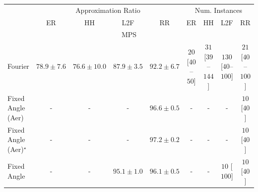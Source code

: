 \begin{tabular}{l|cccc|cccc|}
\toprule
& \multicolumn{4}{c|}{Approximation Ratio} & \multicolumn{4}{c|}{Num. Instances} \\
            & ER & HH & L2F & RR & ER & HH & L2F & RR \\
\midrule
\multicolumn{9}{c}{\rule{0pt}{8pt}MPS} \\
\midrule
Fourier & {\cellcolor[HTML]{FEB340}} \color[HTML]{000000} $78.9\pm 7.6$ & {\cellcolor[HTML]{FEC95B}} \color[HTML]{000000} $76.6\pm 10.0$ & {\cellcolor[HTML]{D65808}} \color[HTML]{F1F1F1} $87.9\pm 3.5$ & {\cellcolor[HTML]{A63A03}} \color[HTML]{F1F1F1} $92.2\pm 6.7$ & {\cellcolor[HTML]{FFF5F1}} \color[HTML]{000000} $20$ [$40$--$50$] & {\cellcolor[HTML]{FFF2EE}} \color[HTML]{000000} $31$ [$39$--$144$] & {\cellcolor[HTML]{FDD6D2}} \color[HTML]{000000} $130$ [$40$--$100$] & {\cellcolor[HTML]{FFF4F0}} \color[HTML]{000000} $21$ [$40$--$100$] \\
Fixed Angle (Aer) & {\cellcolor[HTML]{000000}} \color[HTML]{F1F1F1} {\cellcolor{white}} \color{black} - & {\cellcolor[HTML]{000000}} \color[HTML]{F1F1F1} {\cellcolor{white}} \color{black} - & {\cellcolor[HTML]{000000}} \color[HTML]{F1F1F1} {\cellcolor{white}} \color{black} - & {\cellcolor[HTML]{6C2706}} \color[HTML]{F1F1F1} $96.6\pm 0.5$ & {\cellcolor[HTML]{000000}} \color[HTML]{F1F1F1} {\cellcolor{white}} \color{black} - & {\cellcolor[HTML]{000000}} \color[HTML]{F1F1F1} {\cellcolor{white}} \color{black} - & {\cellcolor[HTML]{000000}} \color[HTML]{F1F1F1} {\cellcolor{white}} \color{black} - & {\cellcolor[HTML]{FFF7F3}} \color[HTML]{000000} $10$ [$40$] \\
Fixed Angle (Aer)$^\star$ & {\cellcolor[HTML]{000000}} \color[HTML]{F1F1F1} {\cellcolor{white}} \color{black} - & {\cellcolor[HTML]{000000}} \color[HTML]{F1F1F1} {\cellcolor{white}} \color{black} - & {\cellcolor[HTML]{000000}} \color[HTML]{F1F1F1} {\cellcolor{white}} \color{black} - & {\cellcolor[HTML]{662506}} \color[HTML]{F1F1F1} $97.2\pm 0.2$ & {\cellcolor[HTML]{000000}} \color[HTML]{F1F1F1} {\cellcolor{white}} \color{black} - & {\cellcolor[HTML]{000000}} \color[HTML]{F1F1F1} {\cellcolor{white}} \color{black} - & {\cellcolor[HTML]{000000}} \color[HTML]{F1F1F1} {\cellcolor{white}} \color{black} - & {\cellcolor[HTML]{FFF7F3}} \color[HTML]{000000} $10$ [$40$] \\
Fixed Angle & {\cellcolor[HTML]{000000}} \color[HTML]{F1F1F1} {\cellcolor{white}} \color{black} - & {\cellcolor[HTML]{000000}} \color[HTML]{F1F1F1} {\cellcolor{white}} \color{black} - & {\cellcolor[HTML]{802D05}} \color[HTML]{F1F1F1} $95.1\pm 1.0$ & {\cellcolor[HTML]{732905}} \color[HTML]{F1F1F1} $96.1\pm 0.5$ & {\cellcolor[HTML]{000000}} \color[HTML]{F1F1F1} {\cellcolor{white}} \color{black} - & {\cellcolor[HTML]{000000}} \color[HTML]{F1F1F1} {\cellcolor{white}} \color{black} - & {\cellcolor[HTML]{FFF7F3}} \color[HTML]{000000} $10$ [$100$] & {\cellcolor[HTML]{FFF7F3}} \color[HTML]{000000} $10$ [$40$] \\

\end{tabular}
